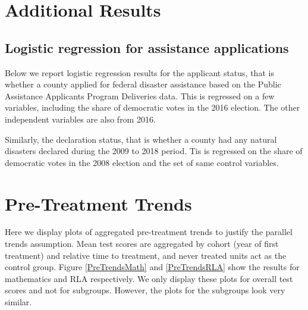 
\section{Additional Results} \label{AppendixA}

\subsection{Logistic regression for assistance applications}

Below we report logistic regression results for the applicant status, that is whether a county applied for federal disaster assistance based on the Public Assistance Applicants Program Deliveries data. This is regressed on a few variables, including the share of democratic votes in the 2016 election. The other independent variables are also from 2016.

Similarly, the declaration status, that is whether a county had any natural disasters declared during the 2009 to 2018 period. Tis is regressed on the share of democratic votes in the 2008 election and the set of same control variables.




\section{Pre-Treatment Trends} \label{PreTrends}

Here we display plots of aggregated pre-treatment trends to justify the parallel trends assumption. Mean test scores are aggregated by cohort (year of first treatment) and relative time to treatment, and never treated units act as the control group. Figure \ref{PreTrendsMath} and \ref{PreTrendsRLA} show the results for mathematics and RLA respectively. We only display these plots for overall test scores and not for subgroups. However, the plots for the subgroups look very similar.


